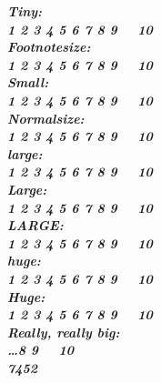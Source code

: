 \documentclass{article}
\begin{document}
\clearpage

\itshape\bfseries
\noindent
Tiny:\\ 
\tiny 1 2 3 4 5 6 7 8 9 \x\ \e\ 10 \\\normalsize
Footnotesize: \\
\footnotesize 1 2 3 4 5 6 7 8 9 \x\ \e\ 10 \\\normalsize
Small: \\
\small 1 2 3 4 5 6 7 8 9 \x\ \e\ 10 \\\normalsize
Normalsize: \\
\normalsize 1 2 3 4 5 6 7 8 9 \x\ \e\ 10 \\\normalsize
large: \\
\large 1 2 3 4 5 6 7 8 9 \x\ \e\ 10 \\\normalsize
Large: \\
\Large 1 2 3 4 5 6 7 8 9 \x\ \e\ 10 \\\normalsize
LARGE: \\
\LARGE 1 2 3 4 5 6 7 8 9 \x\ \e\ 10 \\\normalsize
huge: \\
\huge 1 2 3 4 5 6 7 8 9 \x\ \e\ 10 \\\normalsize
Huge: \\
\Huge 1 2 3 4 5 6 7 8 9 \x\ \e\ 10 \\\normalsize
Really, really big:  \\
\fontsize{50pt}{65pt}\selectfont\ldots 8 9 \x\ \e\
10\\\normalsize
\textit{7452\e{}}
\end{document}
